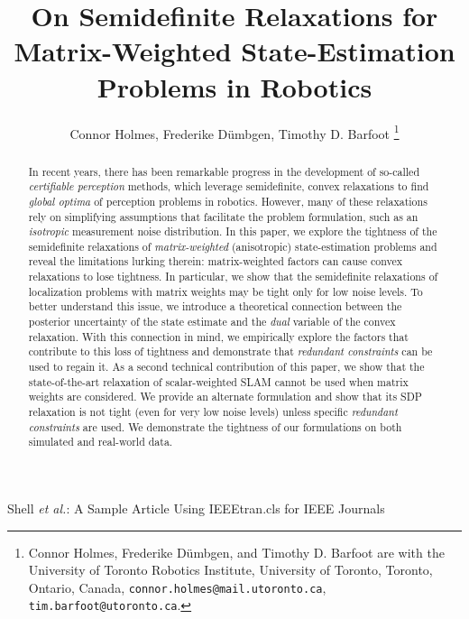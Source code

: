 \documentclass[lettersize,journal]{IEEEtran}
\begin{document}
\title{On Semidefinite Relaxations for Matrix-Weighted State-Estimation Problems in Robotics}

\author{Connor Holmes, Frederike D{\"u}mbgen, Timothy D. Barfoot\vspace*{-0.45in}
\thanks{Connor Holmes, Frederike D{\"u}mbgen, and Timothy D. Barfoot are with the University of Toronto Robotics Institute, University of Toronto, Toronto, Ontario, Canada, \texttt{connor.holmes@mail.utoronto.ca}, \texttt{tim.barfoot@utoronto.ca}.}}%

%
{Shell \MakeLowercase{\textit{et al.}}: A Sample Article Using IEEEtran.cls for IEEE Journals}


%

\maketitle

\begin{abstract}
In recent years, there has been remarkable progress in the development of so-called \emph{certifiable perception} methods, which leverage semidefinite, convex relaxations to find \emph{global optima} of perception problems in robotics. However, many of these relaxations rely on simplifying assumptions that facilitate the problem formulation, such as an \emph{isotropic} measurement noise distribution.
In this paper, we explore the tightness of the semidefinite relaxations of \emph{matrix-weighted} (anisotropic) state-estimation problems and reveal the limitations lurking therein: matrix-weighted factors can cause convex relaxations to lose tightness. In particular, we show that the semidefinite relaxations of localization problems with matrix weights may be tight only for low noise levels. 
To better understand this issue, we introduce a theoretical connection between the posterior uncertainty of the state estimate and the \emph{dual} variable of the convex relaxation.  
With this connection in mind, we empirically explore the factors that contribute to this loss of tightness and demonstrate that \emph{redundant constraints} can be used to regain it.
As a second technical contribution of this paper, we show that the state-of-the-art relaxation of scalar-weighted SLAM cannot be used when matrix weights are considered. We provide an alternate formulation and show that its SDP relaxation is not tight (even for very low noise levels) unless specific \emph{redundant constraints} are used. 
We demonstrate the tightness of our formulations on both simulated and real-world data.

\end{abstract}
\end{document}
